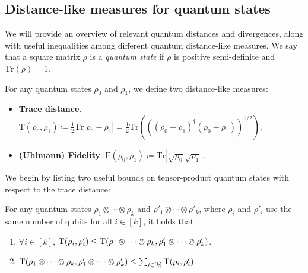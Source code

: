 \documentclass[11pt, a4paper]{article}
\numberwithin{equation}{section}
\numberwithin{figure}{section}
\DeclarePairedDelimiter\rbra{\lparen}{\rparen}
\newcommand{\Tr}{\mathrm{Tr}}
\newcommand{\td}{\mathrm{T}}
\newcommand{\F}{\mathrm{F}}
\begin{document}
\subsection{Distance-like measures for quantum states}

We will provide an overview of relevant quantum distances and divergences, along with useful inequalities among different quantum distance-like measures. We say that a square matrix $\rho$ is a \textit{quantum state} if $\rho$ is positive semi-definite and $\Tr(\rho)=1$.

\begin{definition}
    \label{def:quantum-distances}
    For any quantum states $\rho_0$ and $\rho_1$, we define two distance-like measures: 
    \begin{itemize}
        \item \textnormal{\textbf{Trace distance}.} $\td(\rho_0,\rho_1)\coloneqq\frac{1}{2}\Tr|\rho_0-\rho_1|=\frac{1}{2}\Tr(((\rho_0-\rho_1)^\dagger(\rho_0-\rho_1))^{1/2}).$
        \item \textnormal{\textbf{(Uhlmann) Fidelity}.} $\F(\rho_0,\rho_1)\coloneqq\Tr|\sqrt{\rho_0}\sqrt{\rho_1}|$.
    \end{itemize}
\end{definition}

We begin by listing two useful bounds on tensor-product quantum states with respect to the trace distance: 

\begin{lemma}
    \label{lemma:trace-distance-product-states}
    For any quantum states $\rho_1 \otimes \cdots \otimes \rho_k$ and $\rho'_1 \otimes \cdots \otimes \rho'_k$, where $\rho_i$ and $\rho'_i$ use the same number of qubits for all $i\in[k]$, it holds that
    \begin{enumerate}[label={\upshape(\arabic*)}, itemsep=0.33em, topsep=0.33em, parsep=0.33em]
        \item $\forall i \in [k]$, $\td\rbra*{ \rho_i, \rho'_i } \leq \td\rbra*{\rho_1 \otimes \cdots \otimes \rho_k, \rho'_1 \otimes \cdots \otimes \rho'_k}$.
        \item $\td\rbra*{\rho_1 \otimes \cdots \otimes \rho_k, \rho'_1 \otimes \cdots \otimes \rho'_k} \leq \sum_{i\in [k]} \td \rbra*{ \rho_i, \rho'_i }$. 
    \end{enumerate}
\end{lemma}
\end{document}
